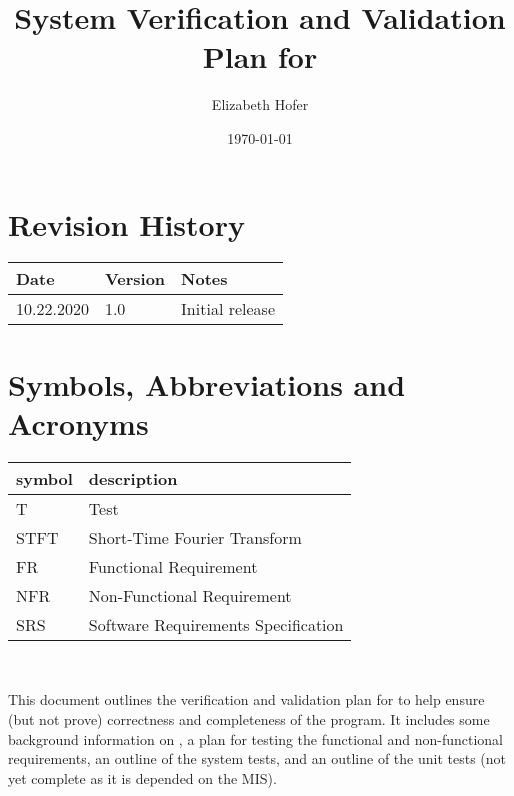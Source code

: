 \documentclass[12pt, titlepage]{article}
\begin{document}
\title{System Verification and Validation Plan for \progname} 
\author{Elizabeth Hofer}
\date{\today}
	
\maketitle


\section{Revision History}

\begin{tabularx}{\textwidth}{p{3cm}p{2cm}X}
\toprule {\bf Date} & {\bf Version} & {\bf Notes}\\
\midrule
10.22.2020 & 1.0 & Initial release\\
\bottomrule
\end{tabularx}

\newpage

\tableofcontents

\listoftables

\listoffigures

\newpage

\section{Symbols, Abbreviations and Acronyms}

\renewcommand{\arraystretch}{1.2}
\begin{tabular}{l l} 
  \toprule		
  \textbf{symbol} & \textbf{description}\\
  \midrule 
  T & Test\\
  STFT & Short-Time Fourier Transform\\
  FR & Functional Requirement \\
  NFR & Non-Functional Requirement\\  
  SRS & Software Requirements Specification\\ 
   \bottomrule
\end{tabular}\\


\newpage


This document outlines the verification and validation plan for \progname{} to help ensure (but not prove) correctness and completeness of the program. It includes some background information on \progname{}, a plan for testing the functional and non-functional requirements, an outline of the system tests, and an outline of the unit tests  (not yet complete as it is depended on the MIS).
\end{document}
